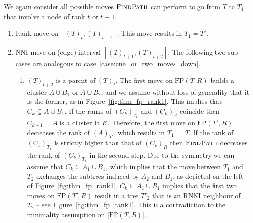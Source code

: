 \documentclass[11pt]{amsart}
\newcommand{\rnni}{\mathrm{RNNI}}
\newcommand{\findpath}{\textsc{FindPath}}
\newcommand{\nni}{\mathrm{NNI}}
\newcommand{\fp}{\mathrm{FP}}
\begin{document}
We again consider all possible moves $\findpath$ can perform to go from $T$ to $T_1$ that involve a node of rank $t$ or $t+1$.

\begin{enumerate}[label = 2.\arabic*]
\item Rank move on $[(T)_t,(T)_{t+1}]$.
This move results in $T_1 = T'$.

\item $\nni$ move on (edge) interval $[(T)_{t+1},(T)_{t+2}]$.
The following two sub-cases are analogous to case~\ref{case:one_or_two_moves_down}.

\begin{enumerate}[label = \theenumi.\arabic*]
\item $(T)_{t+2}$ is a parent of $(T)_t$.
The first move on $\fp(T, R)$ builds a cluster $A \cup B_1$ or $A \cup B_2$, and we assume without loss of generality that it is the former, as in Figure~\ref{fig:thm_fp_rank1}.
This implies that $C_k \subseteq A \cup B_1$.
If the ranks of $(C_k)_{T_1}$ and $(C_k)_R$ coincide then $C_{k-1} = A$ is a cluster in $R$.
Therefore, the first move on $\fp(T', R)$ decreases the rank of $(A)_{T'}$, which results in $T_1' = T$.
If the rank of $(C_k)_{T_1}$ is strictly higher than that of $(C_k)_R$ then $\findpath$ decreases the rank of $(C_k)_{T_1}$ in the second step.
Due to the symmetry we can assume that $C_k \subseteq A_1 \cup B_1$, which implies that the move between $T_1$ and $T_2$ exchanges the subtrees induced by $A_2$ and $B_1$, as depicted on the left of Figure~\ref{fig:thm_fp_rank1}.
$C_k \subseteq A_1 \cup B_1$ implies that the first two moves on $\fp(T', R)$ result in a tree $T'_2$ that is an $\rnni$ neighbour of $T_2$ -- see Figure~\ref{fig:thm_fp_rank1}.
This is a contradiction to the minimality assumption on $|\fp(T,R)|$.


\end{enumerate}
\end{enumerate}
\end{document}
